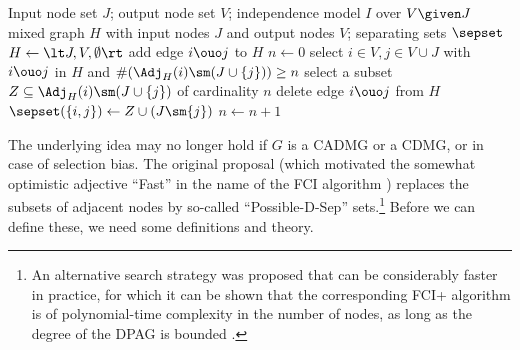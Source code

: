 \begin{algorithm}
  \begin{algorithmic}[1]
  \Input Input node set $J$; output node set $V$; independence model $I$ over $V \given J$
  \Output mixed graph $H$ with input nodes $J$ and output nodes $V$; separating sets $\sepset$
  \State $H \leftarrow \lt J, V, \emptyset \rt$
    \State add edge $i \ouo j$ to $H$
  \EndFor
  \State $n \leftarrow 0$
    \Repeat
    \Repeat
    \State select $i\in V, j \in V \cup J$ with $i \ouo j$ in $H$ and $\#(\Adj_H(i)\sm(J\cup\{j\})) \ge n$
    \State select a subset $Z \subseteq \Adj_H(i)\sm(J\cup\{j\})$ of cardinality $n$
      \State delete edge $i \ouo j$ from $H$
      \State $\sepset(\{i,j\}) \leftarrow Z \cup (J \sm \{j\})$
    \EndIf
    \State $n \leftarrow n + 1$
  \end{algorithmic}
  \caption{Extended PC skeleton algorithm $\mathtt{PCskeleton}(J,V,I)$.\label{alg:pc_skeleton_extended}}
\end{algorithm}

The underlying idea may no longer hold if $G$ is a CADMG or a CDMG, or in case of selection bias.
The original proposal (which motivated the somewhat optimistic adjective ``Fast'' in the name of the FCI algorithm \cite{SMR1995}) replaces the subsets of adjacent nodes by so-called ``Possible-D-Sep'' sets.\footnote{An alternative search strategy was proposed that can be considerably faster in practice, for which it can be shown that the corresponding FCI+ algorithm is of polynomial-time complexity in the number of nodes, as long as the degree of the DPAG is bounded \cite{ClaassenMooijHeskes_UAI_13}.}
Before we can define these, we need some definitions and theory.

